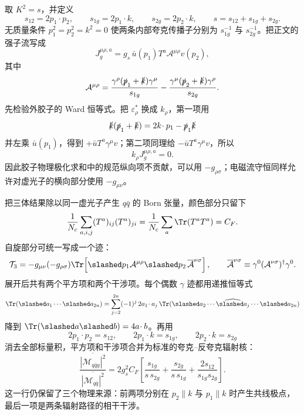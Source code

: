\begin{derivation}[三喷注产生的能量分布]
取 $K^2=s$，并定义
\begin{equation*}
s_{12}=2p_1\!\cdot p_2,\qquad
s_{1g}=2p_1\!\cdot k,\qquad
s_{2g}=2p_2\!\cdot k,\qquad
s=s_{12}+s_{1g}+s_{2g}.
\end{equation*}
无质量条件 $p_1^2=p_2^2=k^2=0$ 使两条内部夸克传播子分别为 $s_{1g}^{-1}$ 与 $s_{2g}^{-1}$。把正文的强子流写成
\begin{equation*}
J_g^{\mu\rho,a}
=g_s\,\bar u(p_1)T^a\mathcal A^{\mu\rho}v(p_2),
\end{equation*}
其中
\begin{equation*}
\mathcal A^{\mu\rho}
=\frac{\gamma^\rho(\slashed p_1+\slashed k)\gamma^\mu}{s_{1g}}
-\frac{\gamma^\mu(\slashed p_2+\slashed k)\gamma^\rho}{s_{2g}}.
\end{equation*}
先检验外胶子的 Ward 恒等式。把 $\varepsilon_\rho^*$ 换成 $k_\rho$，第一项用
\begin{equation*}
\slashed k(\slashed p_1+\slashed k)
=2k\!\cdot p_1-\slashed p_1\slashed k
\end{equation*}
并左乘 $\bar u(p_1)$，得到 $+\bar uT^a\gamma^\mu v$；第二项同理给 $-\bar uT^a\gamma^\mu v$，所以
\begin{equation*}
k_\rho J_g^{\mu\rho,a}=0.
\end{equation*}
因此胶子物理极化求和中的规范纵向项不贡献，可以用 $-g_{\rho\sigma}$；电磁流守恒同样允许对虚光子的横向部分使用 $-g_{\mu\nu}$。

把三体结果除以同一虚光子产生 $q\bar q$ 的 Born 张量，颜色部分只留下
\begin{equation*}
\frac1{N_c}\sum_{a,i,j}(T^a)_{ij}(T^a)_{ji}
=\frac1{N_c}\sum_a\Tr(T^aT^a)=C_F.
\end{equation*}
自旋部分可统一写成一个迹：
\begin{equation*}
\mathcal T_3
=-g_{\mu\nu}(-g_{\rho\sigma})
\Tr\!\left[
\slashed p_1\mathcal A^{\mu\rho}
\slashed p_2\,\overline{\mathcal A}^{\nu\sigma}
\right],
\qquad
\overline{\mathcal A}^{\nu\sigma}
\equiv\gamma^0(\mathcal A^{\nu\sigma})^\dagger\gamma^0.
\end{equation*}
展开后共有两个平方项和两个干涉项。每个偶数 $\gamma$ 迹都用递推恒等式
\begin{equation*}
\Tr(\slashed a_1\cdots\slashed a_{2n})
=\sum_{j=2}^{2n}(-1)^j\,2a_1\!\cdot a_j\,
\Tr(\slashed a_2\cdots\widehat{\slashed a_j}\cdots\slashed a_{2n})
\end{equation*}
降到 $\Tr(\slashed a\slashed b)=4a\!\cdot b$。再用
\begin{equation*}
2p_1\!\cdot p_2=s_{12},\qquad
2p_1\!\cdot k=s_{1g},\qquad
2p_2\!\cdot k=s_{2g}
\end{equation*}
消去全部标量积，平方项和干涉项合并为标准的夸克--反夸克辐射核：
\begin{equation*}
\frac{\overline{|\mathcal M_{q\bar qg}|^2}}
{\overline{|\mathcal M_{q\bar q}|^2}}
=2g_s^2C_F
\left[
\frac{s_{1g}}{s\,s_{2g}}
+\frac{s_{2g}}{s\,s_{1g}}
+\frac{2s_{12}}{s_{1g}s_{2g}}
\right].
\end{equation*}
这一行仍保留了三个物理来源：前两项分别在 $p_2\parallel k$ 与 $p_1\parallel k$ 时产生共线极点，最后一项是两条辐射路径的相干干涉。


\end{derivation}
